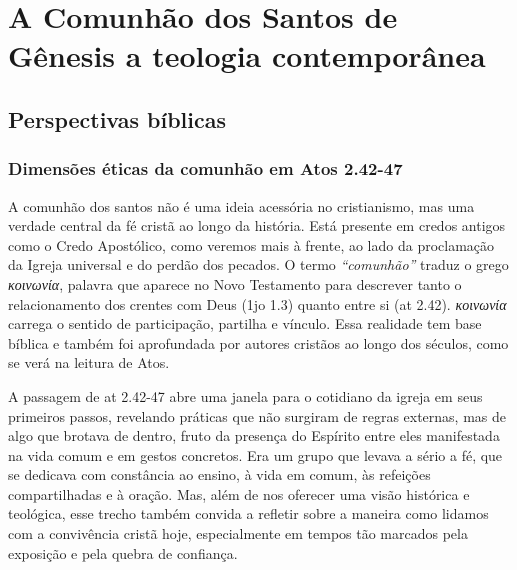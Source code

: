 \chapter{A Comunhão dos Santos de Gênesis a teologia contemporânea}

\section{Perspectivas bíblicas}

\subsection{Dimensões éticas da comunhão em Atos 2.42-47}

A comunhão dos santos não é uma ideia acessória no cristianismo, mas uma verdade central da fé cristã ao longo da história. Está presente em credos antigos como o Credo Apostólico, como veremos mais à frente, ao lado da proclamação da Igreja universal e do perdão dos pecados. O termo \textit{``comunhão''} traduz o grego \textit{\foreignlanguage{greek}{κοινωνία}}, palavra que aparece no Novo Testamento para descrever tanto o relacionamento dos crentes com Deus (\gls{1jo} 1.3) quanto entre si (\gls{at} 2.42). \textit{\foreignlanguage{greek}{κοινωνία}} carrega o sentido de participação, partilha e vínculo. Essa realidade tem base bíblica e também foi aprofundada por autores cristãos ao longo dos séculos, como se verá na leitura de Atos.

A passagem de \gls{at} 2.42-47 abre uma janela para o cotidiano da igreja em seus primeiros passos, revelando práticas que não surgiram de regras externas, mas de algo que brotava de dentro, fruto da presença do Espírito entre eles manifestada na vida comum e em gestos concretos. Era um grupo que levava a sério a fé, que se dedicava com constância ao ensino, à vida em comum, às refeições compartilhadas e à oração. Mas, além de nos oferecer uma visão histórica e teológica, esse trecho também convida a refletir sobre a maneira como lidamos com a convivência cristã hoje, especialmente em tempos tão marcados pela exposição e pela quebra de confiança.

